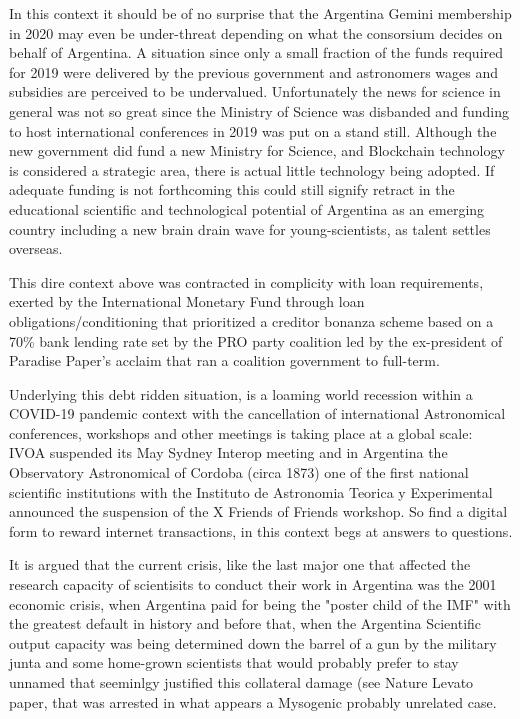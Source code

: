 \documentclass[final,5p,times,twocolumn,authoryear]{elsarticle}
\begin{document}
In this context it should be of no surprise that the Argentina Gemini membership in 2020 may even be under-threat depending on what the consorsium decides on behalf of Argentina. A situation since only a small fraction of the funds required for 2019 were delivered by the previous government and astronomers wages and subsidies are perceived to be undervalued. Unfortunately the news for science in general was not so great since the Ministry of Science was disbanded and funding to host international conferences in 2019 was put on a stand still. Although the new government did fund a new Ministry for Science, and Blockchain technology is considered a strategic area, there is actual little technology being adopted. If adequate funding is not forthcoming this could still signify retract in the educational scientific and technological potential of Argentina as an emerging country including a new brain drain wave for young-scientists, as talent settles overseas. 

This dire context above was contracted in complicity with loan requirements, exerted by the International Monetary Fund through loan obligations/conditioning that prioritized a creditor bonanza scheme based on a 70\% bank lending rate set by the PRO party coalition led by the ex-president of Paradise Paper's acclaim that ran a coalition government to full-term. 

Underlying this debt ridden situation, is a loaming world recession within a COVID-19 pandemic context with the cancellation of international Astronomical conferences, workshops and other meetings is taking place at a global scale: IVOA suspended its May Sydney Interop meeting and in Argentina the Observatory Astronomical of Cordoba (circa 1873) one of the first national scientific institutions with the Instituto de Astronomia Teorica y Experimental announced the suspension of the X Friends of Friends workshop. So find a digital form to reward internet transactions, in this context begs at answers to questions.

It is argued that the current crisis, like the last major one that affected the research capacity of scientisits to conduct their work in Argentina was the 2001 economic crisis, when Argentina paid for being the "poster child of the IMF" with the greatest default in history and before that, when the Argentina Scientific output capacity was being determined down the barrel of a gun by the military junta and some home-grown scientists that would probably prefer to stay unnamed that seeminlgy justified this collateral damage (see Nature Levato paper, that was arrested in what appears a Mysogenic probably unrelated case.
\end{document}
